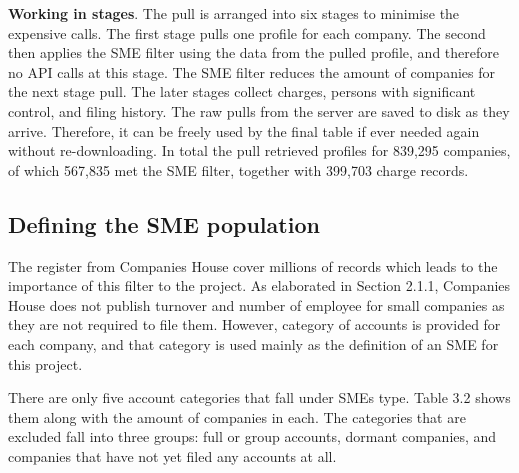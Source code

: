 \documentclass[ %
                    author={Natchalin Iwsakul \\ Inkaphol Siriwongwattana \\ Tanaphan Kummaraphat \\ Patorn Srisupap},
                supervisor={Fernando Moreno-Pino},
                    degree={MSc},
                     title={Propensity Modelling for SME Commercial Lending Using Open Public Data},
                  subtitle={Companies House filings and GDELT media coverage as predictors of first-time borrowing},
                      type={},
                      year={2026}]{dissertation}
\begin{document}
  \textbf{Working in stages}. The pull is arranged into six stages to minimise the expensive calls. The first stage pulls one profile for each company. The second then applies the SME filter using the data from the pulled profile, and therefore no API calls at this stage. The SME filter reduces the amount of companies for the next stage pull. The later stages collect charges, persons with significant control, and filing history. The raw pulls from the server are saved to disk as they arrive. Therefore, it can be freely used by the final table if ever needed again without re-downloading. In total the pull retrieved profiles for 839,295 companies, of which 567,835 met the SME filter, together with 399,703 charge records.
  
  \subsection{Defining the SME population}
  \label{chap:defining_sme_pop}
The register from Companies House cover millions of records which leads to the importance of this filter to the project. As elaborated in Section 2.1.1, Companies House does not publish turnover and number of employee for small companies as they are not required to file them. However, category of accounts is provided for each company, and that category is used mainly as the definition of an SME for this project.

There are only five account categories that fall under SMEs type. Table 3.2 shows them along with the amount of companies in each. The categories that are excluded fall into three groups: full or group accounts, dormant companies, and companies that have not yet filed any accounts at all.
\end{document}
